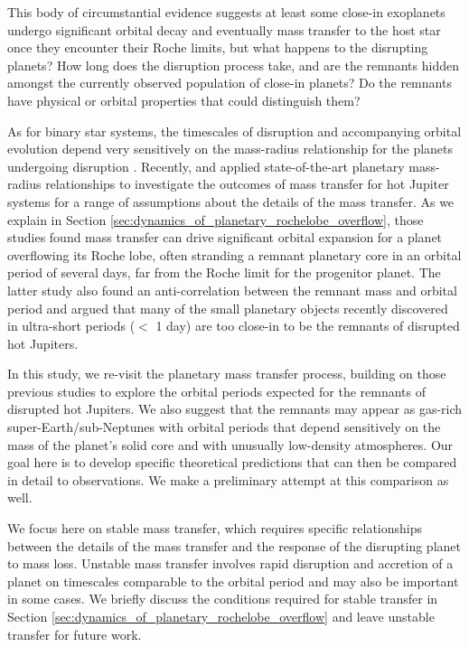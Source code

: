 \documentclass{svjour3}                     %
\begin{document}
This body of circumstantial evidence suggests at least some close-in exoplanets undergo significant orbital decay and eventually mass transfer to the host star once they encounter their Roche limits, but what happens to the disrupting planets? How long does the disruption process take, and are the remnants hidden amongst the currently observed population of close-in planets? Do the remnants have physical or orbital properties that could distinguish them? 

As for binary star systems, the timescales of disruption and accompanying orbital evolution depend very sensitively on the mass-radius relationship for the planets undergoing disruption \cite{Rappaport1982}. Recently, \cite{2014ApJ...793L...3V} and \cite{2015ApJ...813..101V} applied state-of-the-art planetary mass-radius relationships to investigate the outcomes of mass transfer for hot Jupiter systems for a range of assumptions about the details of the mass transfer. As we explain in Section \ref{sec:dynamics_of_planetary_rochelobe_overflow}, those studies found mass transfer can drive significant orbital expansion for a planet overflowing its Roche lobe, often stranding a remnant planetary core in an orbital period of several days, far from the Roche limit for the progenitor planet. The latter study also found an anti-correlation between the remnant mass and orbital period and argued that many of the small planetary objects recently discovered in ultra-short periods ($<$ 1 day) \cite{2014ApJ...787...47S,2016arXiv160306488A} are too close-in to be the remnants of disrupted hot Jupiters.

In this study, we re-visit the planetary mass transfer process, building on those previous studies to explore the orbital periods expected for the remnants of disrupted hot Jupiters. We also suggest that the remnants may appear as gas-rich super-Earth/sub-Neptunes with orbital periods that depend sensitively on the mass of the planet's solid core and with unusually low-density atmospheres. Our goal here is to develop specific theoretical predictions that can then be compared in detail to observations. We make a preliminary attempt at this comparison as well.

We focus here on stable mass transfer, which requires specific relationships between the details of the mass transfer and the response of the disrupting planet to mass loss. Unstable mass transfer involves rapid disruption and accretion of a planet on timescales comparable to the orbital period \cite{2002ApJ...565.1107P} and may also be important in some cases. We briefly discuss the conditions required for stable transfer in Section \ref{sec:dynamics_of_planetary_rochelobe_overflow} and leave unstable transfer for future work.
\end{document}
